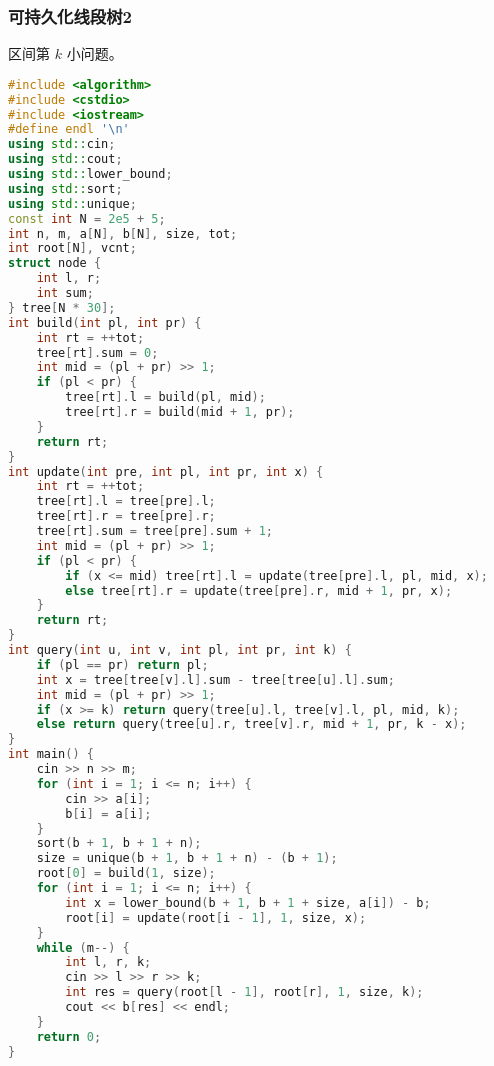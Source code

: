 \documentclass[9pt, a4paper, oneside]{book}
\begin{document}
\subsubsection{可持久化线段树2}
区间第 $k$ 小问题。
\begin{lstlisting}[language={C++}]
#include <algorithm>
#include <cstdio>
#include <iostream>
#define endl '\n'
using std::cin;
using std::cout;
using std::lower_bound;
using std::sort;
using std::unique;
const int N = 2e5 + 5;
int n, m, a[N], b[N], size, tot;
int root[N], vcnt;
struct node {
    int l, r;
    int sum;
} tree[N * 30];
int build(int pl, int pr) {
    int rt = ++tot;
    tree[rt].sum = 0;
    int mid = (pl + pr) >> 1;
    if (pl < pr) {
        tree[rt].l = build(pl, mid);
        tree[rt].r = build(mid + 1, pr);
    }
    return rt;
}
int update(int pre, int pl, int pr, int x) {
    int rt = ++tot;
    tree[rt].l = tree[pre].l;
    tree[rt].r = tree[pre].r;
    tree[rt].sum = tree[pre].sum + 1;
    int mid = (pl + pr) >> 1;
    if (pl < pr) {
        if (x <= mid) tree[rt].l = update(tree[pre].l, pl, mid, x);
        else tree[rt].r = update(tree[pre].r, mid + 1, pr, x);
    }
    return rt;
}
int query(int u, int v, int pl, int pr, int k) {
    if (pl == pr) return pl;
    int x = tree[tree[v].l].sum - tree[tree[u].l].sum;
    int mid = (pl + pr) >> 1;
    if (x >= k) return query(tree[u].l, tree[v].l, pl, mid, k);
    else return query(tree[u].r, tree[v].r, mid + 1, pr, k - x);
}
int main() {
    cin >> n >> m;
    for (int i = 1; i <= n; i++) {
        cin >> a[i];
        b[i] = a[i];
    }
    sort(b + 1, b + 1 + n);
    size = unique(b + 1, b + 1 + n) - (b + 1);
    root[0] = build(1, size);
    for (int i = 1; i <= n; i++) {
        int x = lower_bound(b + 1, b + 1 + size, a[i]) - b;
        root[i] = update(root[i - 1], 1, size, x);
    }
    while (m--) {
        int l, r, k;
        cin >> l >> r >> k;
        int res = query(root[l - 1], root[r], 1, size, k);
        cout << b[res] << endl;
    }
    return 0;
}\end{lstlisting}
\end{document}
